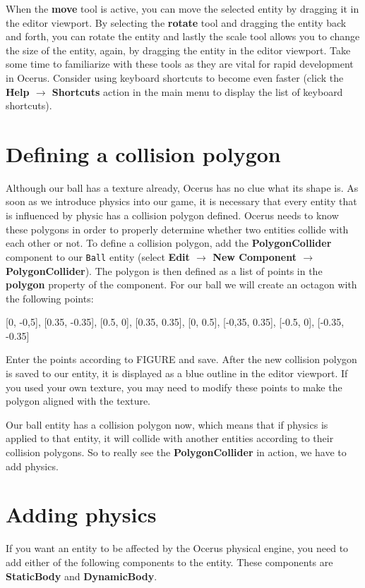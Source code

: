 \documentclass[a4paper,12pt]{article}
\begin{document}
When the \textbf{move} tool is active, you can move the selected entity by dragging it in the editor viewport. By selecting the \textbf{rotate} tool and dragging the entity back and forth, you can rotate the entity and lastly the scale tool allows you to change the size of the entity, again, by dragging the entity in the editor viewport. Take some time to familiarize with these tools as they are vital for rapid development in Ocerus. Consider using keyboard shortcuts to become even faster (click the \textbf{Help $\to$ Shortcuts} action in the main menu to display the list of keyboard shortcuts).

\section{Defining a collision polygon}
Although our ball has a texture already, Ocerus has no clue what its shape is. As soon as we introduce physics into our game, it is necessary that every entity that is influenced by physic has a collision polygon defined. Ocerus needs to know these polygons in order to properly determine whether two entities collide with each other or not. To define a collision polygon, add the \textbf{PolygonCollider} component to our \texttt{Ball} entity (select \textbf{Edit $\to$ New Component $\to$ PolygonCollider}). The polygon is then defined as a list of points in the \textbf{polygon} property of the component. For our ball we will create an octagon with the following points:

[0, -0,5], [0.35, -0.35], [0.5, 0], [0.35, 0.35], [0, 0.5], [-0,35, 0.35], [-0.5, 0], [-0.35, -0.35]


Enter the points according to FIGURE and save. After the new collision polygon is saved to our entity, it is displayed as a blue outline in the editor viewport. If you used your own texture, you may need to modify these points to make the polygon aligned with the texture.

Our ball entity has a collision polygon now, which means that if physics is applied to that entity, it will collide with another entities according to their collision polygons. So to really see the \textbf{PolygonCollider} in action, we have to add physics.

\section{Adding physics}
If you want an entity to be affected by the Ocerus physical engine, you need to add either of the following components to the entity. These components are \textbf{StaticBody} and \textbf{DynamicBody}.
\end{document}
